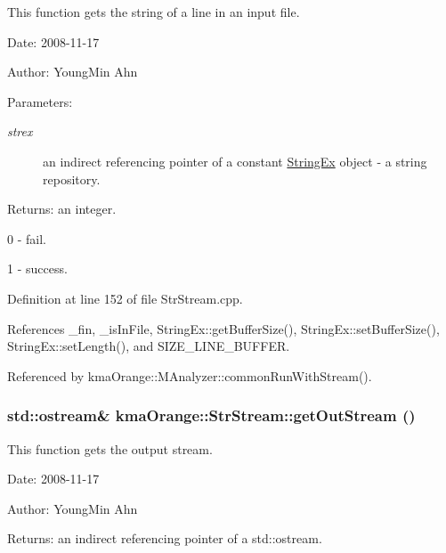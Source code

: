This function gets the string of a line in an input file. 

\begin{Desc}
\item[Date:]2008-11-17 \end{Desc}
\begin{Desc}
\item[Author:]YoungMin Ahn \end{Desc}
\begin{Desc}
\item[Parameters:]
\begin{description}
\item[{\em strex}]an indirect referencing pointer of a constant \hyperlink{classStringEx}{StringEx} object - a string repository. \end{description}
\end{Desc}
\begin{Desc}
\item[Returns:]an integer.\par
 0 - fail.\par
 1 - success. \end{Desc}


Definition at line 152 of file StrStream.cpp.

References \_\-fin, \_\-isInFile, StringEx::getBufferSize(), StringEx::setBufferSize(), StringEx::setLength(), and SIZE\_\-LINE\_\-BUFFER.

Referenced by kmaOrange::MAnalyzer::commonRunWithStream().\hypertarget{classkmaOrange_1_1StrStream_c08555e223358f4758518cd678161cf2}{
\subsubsection[{getOutStream}]{\setlength{\rightskip}{0pt plus 5cm}std::ostream\& kmaOrange::StrStream::getOutStream ()}}
\label{classkmaOrange_1_1StrStream_c08555e223358f4758518cd678161cf2}


This function gets the output stream. 

\begin{Desc}
\item[Date:]2008-11-17 \end{Desc}
\begin{Desc}
\item[Author:]YoungMin Ahn \end{Desc}
\begin{Desc}
\item[Returns:]an indirect referencing pointer of a std::ostream. \end{Desc}


